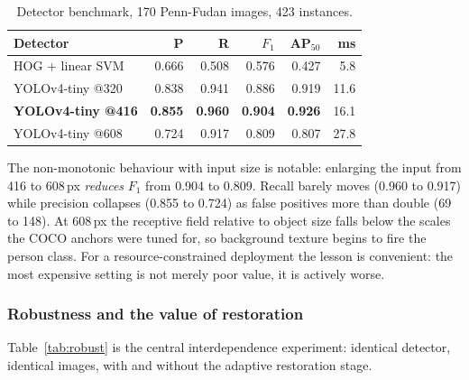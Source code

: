 \documentclass[conference,10pt]{IEEEtran}
\newcommand{\hdr}[1]{\textbf{#1}}
\begin{document}
\begin{table}[!t]
\caption{Detector benchmark, 170 Penn-Fudan images, 423 instances.}
\label{tab:det}
\centering
\scriptsize
\begin{tabular}{@{}lrrrrr@{}}
\toprule
\hdr{Detector} & \hdr{P} & \hdr{R} & \hdr{$F_1$} & \hdr{AP$_{50}$} & \hdr{ms} \\
\midrule
HOG + linear SVM          & 0.666 & 0.508 & 0.576 & 0.427 & 5.8 \\
YOLOv4-tiny @320          & 0.838 & 0.941 & 0.886 & 0.919 & 11.6 \\
\textbf{YOLOv4-tiny @416} & \textbf{0.855} & \textbf{0.960} & \textbf{0.904} & \textbf{0.926} & 16.1 \\
YOLOv4-tiny @608          & 0.724 & 0.917 & 0.809 & 0.807 & 27.8 \\
\bottomrule
\end{tabular}
\end{table}

The non-monotonic behaviour with input size is notable: enlarging the input
from 416 to 608\,px \emph{reduces} $F_1$ from 0.904 to 0.809. Recall barely
moves (0.960 to 0.917) while precision collapses (0.855 to 0.724) as false
positives more than double (69 to 148). At 608\,px the receptive field relative
to object size falls below the scales the COCO anchors were tuned for, so
background texture begins to fire the person class. For a resource-constrained
deployment the lesson is convenient: the most expensive setting is not merely
poor value, it is actively worse.

\subsubsection{Robustness and the value of restoration}
Table~\ref{tab:robust} is the central interdependence experiment: identical
detector, identical images, with and without the adaptive restoration stage.
\end{document}
